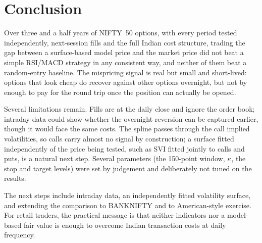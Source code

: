 \documentclass[10pt,journal,compsoc]{IEEEtran}
\begin{document}
\FloatBarrier
\section{Conclusion}

Over three and a half years of NIFTY~50 options, with every period tested independently, next-session fills and the full Indian cost structure, trading the gap between a surface-based model price and the market price did not beat a simple RSI/MACD strategy in any consistent way, and neither of them beat a random-entry baseline. The mispricing signal is real but small and short-lived: options that look cheap do recover against other options overnight, but not by enough to pay for the round trip once the position can actually be opened.

Several limitations remain. Fills are at the daily close and ignore the order book; intraday data could show whether the overnight reversion can be captured earlier, though it would face the same costs. The spline passes through the call implied volatilities, so calls carry almost no signal by construction; a surface fitted independently of the price being tested, such as SVI fitted jointly to calls and puts, is a natural next step. Several parameters (the 150-point window, $\kappa$, the stop and target levels) were set by judgement and deliberately not tuned on the results.

The next steps include intraday data, an independently fitted volatility surface, and extending the comparison to BANKNIFTY and to American-style exercise. For retail traders, the practical message is that neither indicators nor a model-based fair value is enough to overcome Indian transaction costs at daily frequency.
\end{document}
